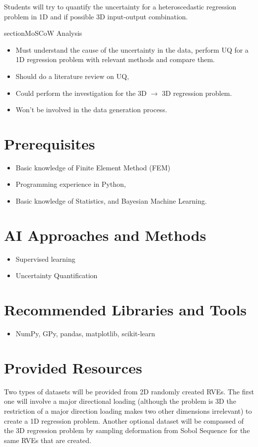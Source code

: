 \documentclass[11pt, english] {article}
\begin{document}
Students will try to quantify the uncertainty for a heteroscedastic regression problem in 1D and if possible 3D input-output combination.

section{MoSCoW Analysis}
\begin{itemize}
  \item Must understand the cause of the uncertainty in the data, perform UQ for a 1D regression problem with relevant methods and compare them.
  \item Should do a literature review on UQ, 
  \item Could perform the investigation for the 3D $\to$ 3D regression problem.
  \item Won’t be involved in the data generation process.
\end{itemize}

\section{Prerequisites}
\begin{itemize}
  \item Basic knowledge of Finite Element Method (FEM)
  \item Programming experience in Python,
  \item Basic knowledge of Statistics, and Bayesian Machine Learning.
\end{itemize}

\section{AI Approaches and Methods}
\begin{itemize}
  \item Supervised learning 
  \item Uncertainty Quantification
\end{itemize}

\section{Recommended Libraries and Tools}
 \begin{itemize}
  \item NumPy, GPy, pandas, matplotlib, scikit-learn
\end{itemize}

\section{Provided Resources}
  Two types of datasets will be provided from 2D randomly created RVEs. The first one will involve a major directional loading (although the problem is 3D the restriction of a major direction loading makes two other dimensions irrelevant) to create a 1D regression problem. Another optional dataset will be compassed of the 3D regression problem by sampling deformation from Sobol Sequence for the same RVEs that are created.



\end{document}
